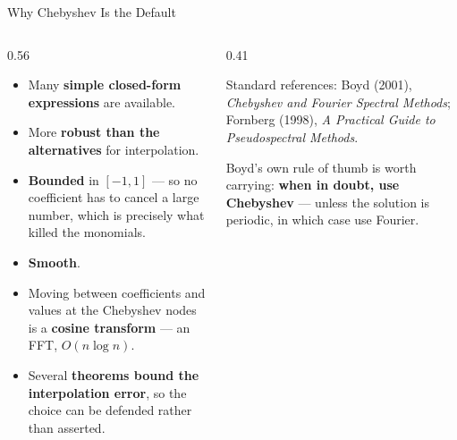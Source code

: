 \begin{frame}{Why Chebyshev Is the Default}
\begin{columns}[T]
\begin{column}{0.56\textwidth}
\small
\begin{itemize}\small\setlength{\itemsep}{1.2mm}
  \item Many \textbf{simple closed-form expressions} are available.
  \item More \textbf{robust than the alternatives} for interpolation.
  \item \textbf{Bounded} in $[-1,1]$ --- so no coefficient has to cancel a large number, which is precisely what killed the monomials.
  \item \textbf{Smooth}.
  \item Moving between coefficients and values at the Chebyshev nodes is a \textbf{cosine transform} --- an FFT, $O(n\log n)$.
  \item Several \textbf{theorems bound the interpolation error}, so the choice can be defended rather than asserted.
\end{itemize}
\end{column}
\begin{column}{0.41\textwidth}
\begin{takeawaybox}\footnotesize
Standard references: Boyd (2001), \emph{Chebyshev and Fourier Spectral Methods}; Fornberg (1998), \emph{A Practical Guide to Pseudospectral Methods}.
\end{takeawaybox}
\medskip
\begin{examplebox}\footnotesize
Boyd's own rule of thumb is worth carrying: \textbf{when in doubt, use Chebyshev} --- unless the solution is periodic, in which case use Fourier.
\end{examplebox}
\end{column}
\end{columns}
\vspace{1mm}
\end{frame}


